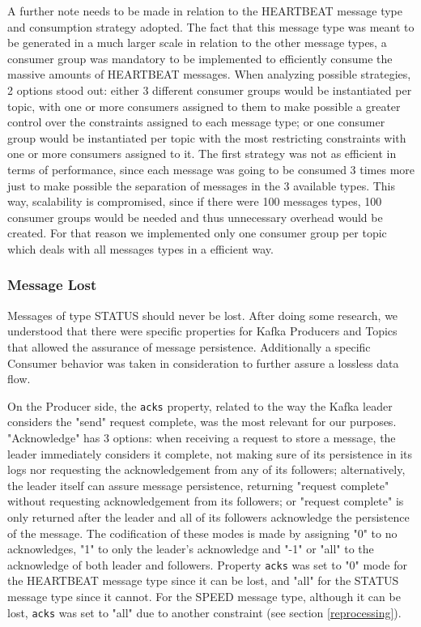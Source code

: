 \documentclass[12pt]{article}
\begin{document}
A further note needs to be made in relation to the HEARTBEAT message type and consumption strategy adopted. 
The fact that this message type was meant to be generated in a much larger scale in relation to the other message types, a consumer group was mandatory to be 
implemented to efficiently consume the massive amounts of HEARTBEAT messages.
When analyzing possible strategies, 2 options stood out: either 3 different consumer groups would be instantiated per topic, with one or more consumers assigned 
to them to make possible a greater control over the constraints assigned to each message type; or one consumer group would be instantiated per topic with the 
most restricting constraints with one or more consumers assigned to it. 
The first strategy was not as efficient in terms of performance, since each message was going to be consumed 3 times more just to make possible the separation 
of messages in the 3 available types. 
This way, scalability is compromised, since if there were 100 messages types, 100 consumer groups would be needed and thus unnecessary overhead would be created.
For that reason we implemented only one consumer group per topic which deals with all messages types in a efficient way. 

\subsubsection{Message Lost}\label{lost}

Messages of type STATUS should never be lost.
After doing some research, we understood that there were specific properties for Kafka Producers and Topics that allowed the assurance of message persistence.
Additionally a specific Consumer behavior was taken in consideration to further assure a lossless data flow.

On the Producer side, the \texttt{acks} property, related to the way the Kafka leader considers the "send" request complete, was the most relevant for our purposes. 
"Acknowledge" has 3 options: 
when receiving a request to store a message, the leader immediately considers it complete, not making sure of its persistence in its logs nor requesting 
the acknowledgement from any of its followers; 
alternatively, the leader itself can assure message persistence, returning "request complete" without requesting acknowledgement from its followers; 
or "request complete" is only returned after the leader and all of its followers acknowledge the persistence of the message. 
The codification of these modes is made by assigning "0" to no acknowledges, "1" to only the leader's acknowledge and "-1" or "all" to the acknowledge of both 
leader and followers. 
Property \texttt{acks} was set to "0" mode for the HEARTBEAT message type since it can be lost, and "all" for the STATUS message type since it cannot. 
For the SPEED message type, although it can be lost, \texttt{acks} was set to "all" due to another constraint (see section \ref{reprocessing}).
\end{document}

